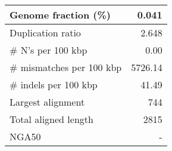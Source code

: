 \documentclass[12pt,a4paper]{article}
\begin{document}
\begin{table}[ht]
\begin{center}
\begin{tabular}{|l*{1}{|r}|}
Genome fraction (\%) & 0.041 \\ \hline
Duplication ratio & 2.648 \\ \hline
\# N's per 100 kbp & 0.00 \\ \hline
\# mismatches per 100 kbp & 5726.14 \\ \hline
\# indels per 100 kbp & 41.49 \\ \hline
Largest alignment & 744 \\ \hline
Total aligned length & 2815 \\ \hline
NGA50 & - \\ \hline
\end{tabular}
\end{center}
\end{table}
\end{document}
